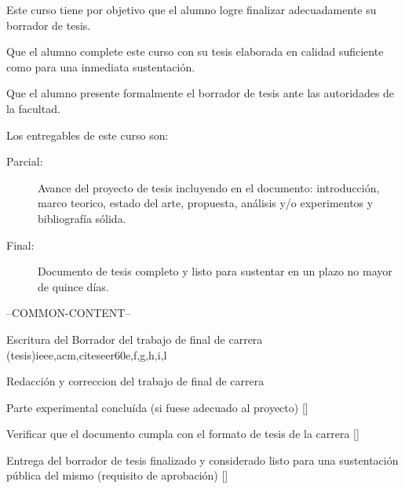 \begin{syllabus}


\begin{justification}
Este curso tiene por objetivo que el alumno logre finalizar adecuadamente su borrador de tesis.
\end{justification}

\begin{goals}
\item Que el alumno complete este curso con su tesis elaborada en calidad suficiente como para una inmediata sustentación.
\item Que el alumno presente formalmente el borrador de tesis ante las autoridades de la facultad.
\item Los entregables de este curso son:
	\begin{description}
	\item [Parcial:] Avance del proyecto de tesis incluyendo en el documento: introducción, marco teorico, estado del arte, propuesta, análisis y/o experimentos y bibliografía sólida.
	\item [Final:] Documento de tesis completo y listo para sustentar en un plazo no mayor de quince días.
	\end{description}
\end{goals}

--COMMON-CONTENT--

\begin{unit}{Escritura del Borrador del trabajo de final de carrera (tesis)}{}{ieee,acm,citeseer}{60}{e,f,g,h,i,l}
\begin{topics}
    \item Redacción y correccion del trabajo de final de carrera
\end{topics}

\begin{learningoutcomes}
    \item Parte experimental concluída (si fuese adecuado al proyecto) [\Assessment]
    \item Verificar que el documento cumpla con el formato de tesis de la carrera [\Assessment]
    \item Entrega del borrador de tesis finalizado y considerado listo para una sustentación pública del mismo (requisito de aprobación) [\Assessment]
\end{learningoutcomes}
\end{unit}

\begin{coursebibliography}
\end{coursebibliography}
\end{syllabus}
